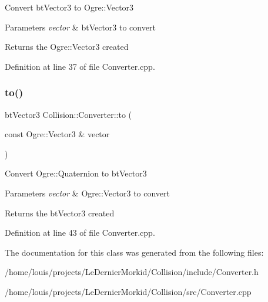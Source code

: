 Convert bt\+Vector3 to Ogre\+::\+Vector3 
\begin{DoxyParams}{Parameters}
{\em vector} & bt\+Vector3 to convert \\
\hline
\end{DoxyParams}
\begin{DoxyReturn}{Returns}
the Ogre\+::\+Vector3 created 
\end{DoxyReturn}


Definition at line 37 of file Converter.\+cpp.

\mbox{\label{class_collision_1_1_converter_a38f61c45f9f05299d3152c729614252c}} 
\subsubsection{\texorpdfstring{to()}{to()}\hspace{0.1cm}{\footnotesize\ttfamily [6/6]}}
{\footnotesize\ttfamily bt\+Vector3 Collision\+::\+Converter\+::to (\begin{DoxyParamCaption}\item[{const Ogre\+::\+Vector3 \&}]{vector }\end{DoxyParamCaption})\hspace{0.3cm}{\ttfamily [static]}}

Convert Ogre\+::\+Quaternion to bt\+Vector3 
\begin{DoxyParams}{Parameters}
{\em vector} & Ogre\+::\+Vector3 to convert \\
\hline
\end{DoxyParams}
\begin{DoxyReturn}{Returns}
the bt\+Vector3 created 
\end{DoxyReturn}


Definition at line 43 of file Converter.\+cpp.



The documentation for this class was generated from the following files\+:\begin{DoxyCompactItemize}
\item 
/home/louis/projects/\+Le\+Dernier\+Morkid/\+Collision/include/Converter.\+h\item 
/home/louis/projects/\+Le\+Dernier\+Morkid/\+Collision/src/Converter.\+cpp\end{DoxyCompactItemize}
